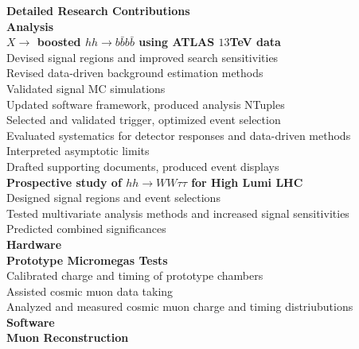 \documentclass[letterpaper,11pt,oneside]{article}
\begin{document}
\newpage
\raggedright
\normalsize
\textbf{\Large{Detailed Research Contributions}} \\
\vspace{0.4cm}
 \textbf{Analysis}\\
	\vspace{0.1cm}
 	\quad \textbf{$X \to$ boosted $ hh \to b\bar{b}b\bar{b}$ using ATLAS $13$TeV data}\\
	\quad \quad Devised signal regions and improved search sensitivities \\
	\quad \quad Revised data-driven background estimation methods \\
	\quad \quad Validated signal MC simulations \\
	\quad \quad Updated software framework, produced analysis NTuples \\
	\quad \quad Selected and validated trigger, optimized event selection \\
	\quad \quad Evaluated systematics for detector responses and data-driven methods \\
	\quad \quad Interpreted asymptotic limits \\
	\quad \quad Drafted supporting documents, produced event displays \\
	\vspace{0.1cm}
 	\quad \textbf{Prospective study of $hh \to WW\tau\tau$ for High Lumi LHC}\\
	\quad \quad  Designed signal regions and event selections\\
	\quad \quad  Tested multivariate analysis methods and increased signal sensitivities \\
	\quad \quad  Predicted combined significances \\
	\vspace{0.4cm}
 \textbf{Hardware}\\
	\vspace{0.1cm}
 	\quad \textbf{Prototype Micromegas Tests}\\
	\quad \quad Calibrated charge and timing of prototype chambers \\
	\quad \quad Assisted cosmic muon data taking \\
	\quad \quad Analyzed and measured cosmic muon charge and timing distriubutions \\
	\vspace{0.4cm}
 \textbf{Software}\\
	\vspace{0.1cm}
 	\quad \textbf{Muon Reconstruction}\\
\end{document}
